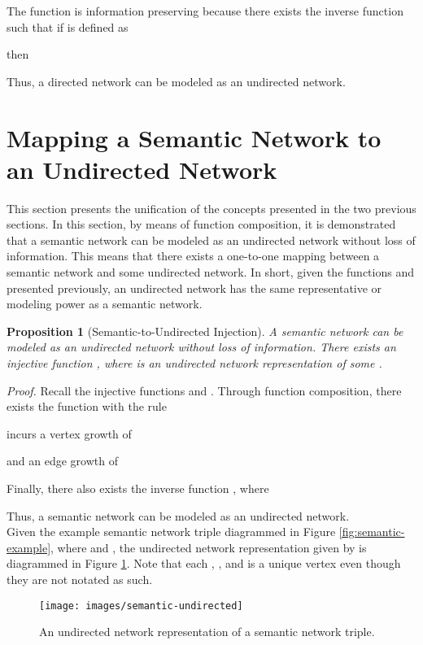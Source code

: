 \documentclass[twocolumn,preprintnumbers,amsmath,amssymb,letter]{revtex4}
\newtheorem{proposition}{Proposition}
\newcommand{\qed}{\hfill  \hfill \\}
\begin{document}
The function  is information preserving because there exists the inverse function  such that if  is defined as

then

Thus, a directed network can be modeled as an undirected network. \qed

\section{Mapping a Semantic Network to an Undirected Network\label{sec:sem-to-und}}

This section presents the unification of the concepts presented in the two previous sections. In this section, by means of function composition, it is demonstrated that a semantic network can be modeled as an undirected network without loss of information. This means that there exists a one-to-one mapping between a semantic network and some undirected network. In short, given the functions  and  presented previously, an undirected network has the same representative or modeling power as a semantic network.

\begin{proposition}[Semantic-to-Undirected Injection]
A semantic network can be modeled as an undirected network without loss of information. There exists an injective function , where  is an undirected network representation of some .
\end{proposition}
\emph{Proof.} Recall the injective functions  and . Through function composition, there exists the function  with the rule

 incurs a vertex growth of 

and an edge growth of



Finally, there also exists the inverse function , where

Thus, a semantic network can be modeled as an undirected network. \qed

Given the example semantic network triple diagrammed in Figure \ref{fig:semantic-example}, where  and , the undirected network representation given by  is diagrammed in Figure \ref{fig:semantic-undirected}. Note that each , , and  is a unique vertex even though they are not notated as such.
\begin{figure}[h!]
	\centering
	\texttt{[image: images/semantic-undirected]}
	 \caption{\label{fig:semantic-undirected}An undirected network representation of a semantic network triple.}
\end{figure}
\end{document}
